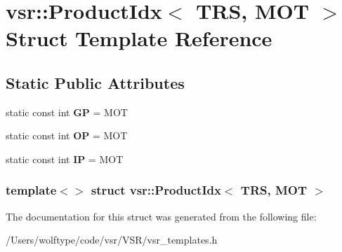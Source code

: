 \hypertarget{structvsr_1_1_product_idx_3_01_t_r_s_00_01_m_o_t_01_4}{\section{vsr\-:\-:Product\-Idx$<$ T\-R\-S, M\-O\-T $>$ Struct Template Reference}
\label{structvsr_1_1_product_idx_3_01_t_r_s_00_01_m_o_t_01_4}
}
\subsection*{Static Public Attributes}
\begin{DoxyCompactItemize}
\item 
\hypertarget{structvsr_1_1_product_idx_3_01_t_r_s_00_01_m_o_t_01_4_a690bccc059ba7621e038a231b4494b7a}{static const int {\bfseries G\-P} = M\-O\-T}\label{structvsr_1_1_product_idx_3_01_t_r_s_00_01_m_o_t_01_4_a690bccc059ba7621e038a231b4494b7a}

\item 
\hypertarget{structvsr_1_1_product_idx_3_01_t_r_s_00_01_m_o_t_01_4_ab572a10b3db3365ac013e569fdbb58ea}{static const int {\bfseries O\-P} = M\-O\-T}\label{structvsr_1_1_product_idx_3_01_t_r_s_00_01_m_o_t_01_4_ab572a10b3db3365ac013e569fdbb58ea}

\item 
\hypertarget{structvsr_1_1_product_idx_3_01_t_r_s_00_01_m_o_t_01_4_a6abe0a40482da33d0befcba905063fff}{static const int {\bfseries I\-P} = M\-O\-T}\label{structvsr_1_1_product_idx_3_01_t_r_s_00_01_m_o_t_01_4_a6abe0a40482da33d0befcba905063fff}

\end{DoxyCompactItemize}
\subsubsection*{template$<$$>$ struct vsr\-::\-Product\-Idx$<$ T\-R\-S, M\-O\-T $>$}



The documentation for this struct was generated from the following file\-:\begin{DoxyCompactItemize}
\item 
/\-Users/wolftype/code/vsr/\-V\-S\-R/vsr\-\_\-templates.\-h\end{DoxyCompactItemize}
